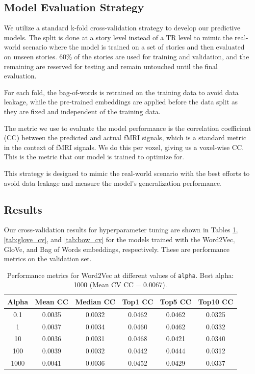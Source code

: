 \documentclass[10pt,letterpaper]{article}
\begin{document}
\subsection{Model Evaluation Strategy}

We utilize a standard k-fold cross-validation strategy to develop our predictive models. The split is done at a story level instead of a TR level to mimic the real-world scenario where the model is trained on a set of stories and then evaluated on unseen stories. 60\% of the stories are used for training and validation, and the remaining are reserved for testing and remain untouched until the final evaluation.

For each fold, the bag-of-words is retrained on the training data to avoid data leakage, while the pre-trained embeddings are applied before the data split as they are fixed and independent of the training data.

The metric we use to evaluate the model performance is the correlation coefficient (CC) between the predicted and actual fMRI signals, which is a standard metric in the context of fMRI signals. We do this per voxel, giving us a voxel-wise CC. This is the metric that our model is trained to optimize for.

This strategy is designed to mimic the real-world scenario with the best efforts to avoid data leakage and measure the model's generalization performance.

\subsection{Results}

Our cross-validation results for hyperparameter tuning are shown in Tables \ref{tab:word2vec_cv}, \ref{tab:glove_cv}, and \ref{tab:bow_cv} for the models trained with the Word2Vec, GloVe, and Bag of Words embeddings, respectively. These are performance metrics on the validation set.


\begin{table}[ht]
\centering
\caption{Performance metrics for Word2Vec at different values of \texttt{alpha}. 
Best alpha: 1000 (Mean CV CC = 0.0067).}
\label{tab:word2vec_cv}
\begin{tabular}{cccccc}
\toprule
\textbf{Alpha} & \textbf{Mean CC} & \textbf{Median CC} & \textbf{Top1 CC} & \textbf{Top5 CC} & \textbf{Top10 CC} \\
\midrule
0.1   & 0.0035 & 0.0032 & 0.0462 & 0.0462 & 0.0325 \\
1     & 0.0037 & 0.0034 & 0.0460 & 0.0462 & 0.0332 \\
10    & 0.0036 & 0.0031 & 0.0468 & 0.0421 & 0.0340 \\
100   & 0.0039 & 0.0032 & 0.0442 & 0.0444 & 0.0312 \\
1000  & 0.0041 & 0.0036 & 0.0452 & 0.0429 & 0.0337 \\
\bottomrule
\end{tabular}
\end{table}
\end{document}
